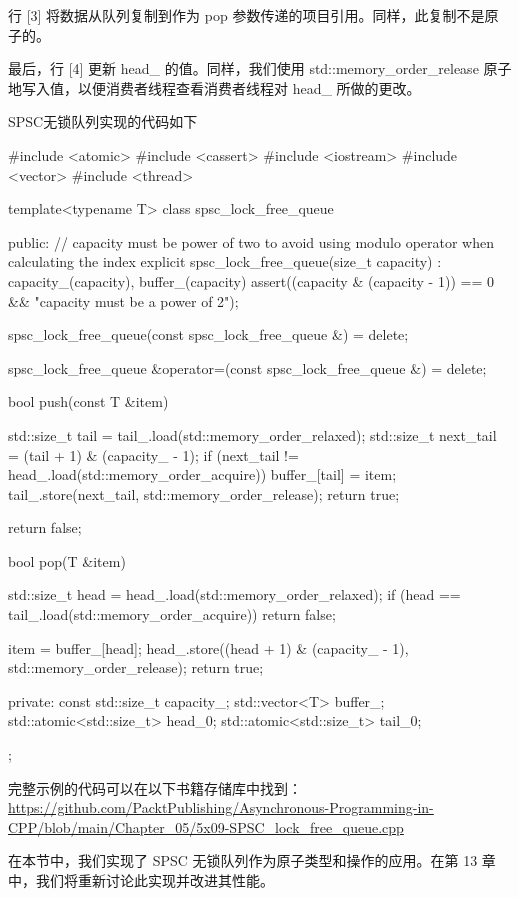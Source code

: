 行 [3] 将数据从队列复制到作为 pop 参数传递的项目引用。同样，此复制不是原子的。

最后，行 [4] 更新 head\_ 的值。同样，我们使用 std::memory\_order\_release 原子地写入值，以便消费者线程查看消费者线程对 head\_ 所做的更改。

SPSC无锁队列实现的代码如下

\begin{cpp}
#include <atomic>
#include <cassert>
#include <iostream>
#include <vector>
#include <thread>

template<typename T>
class spsc_lock_free_queue {
    public:
    // capacity must be power of two to avoid using modulo operator
    when calculating the index
    explicit spsc_lock_free_queue(size_t capacity) : capacity_(capacity), buffer_(capacity) {
        assert((capacity & (capacity - 1)) == 0 && "capacity must be a
        power of 2");
    }

    spsc_lock_free_queue(const spsc_lock_free_queue &) = delete;

    spsc_lock_free_queue &operator=(const spsc_lock_free_queue &) = delete;

    bool push(const T &item) {
        std::size_t tail = tail_.load(std::memory_order_relaxed);
        std::size_t next_tail = (tail + 1) & (capacity_ - 1);
        if (next_tail != head_.load(std::memory_order_acquire)) {
            buffer_[tail] = item;
            tail_.store(next_tail, std::memory_order_release);
            return true;
        }

        return false;
    }

    bool pop(T &item) {
        std::size_t head = head_.load(std::memory_order_relaxed);
        if (head == tail_.load(std::memory_order_acquire)) {
            return false;
        }

        item = buffer_[head];
        head_.store((head + 1) & (capacity_ - 1), std::memory_order_release);
        return true;
    }
private:
    const std::size_t capacity_;
    std::vector<T> buffer_;
    std::atomic<std::size_t> head_{0};
    std::atomic<std::size_t> tail_{0};
};
\end{cpp}

完整示例的代码可以在以下书籍存储库中找到：  \url{https://github.com/PacktPublishing/Asynchronous-Programming-in-CPP/blob/main/Chapter_05/5x09-SPSC_lock_free_queue.cpp}

在本节中，我们实现了 SPSC 无锁队列作为原子类型和操作的应用。在第 13 章中，我们将重新讨论此实现并改进其性能。




